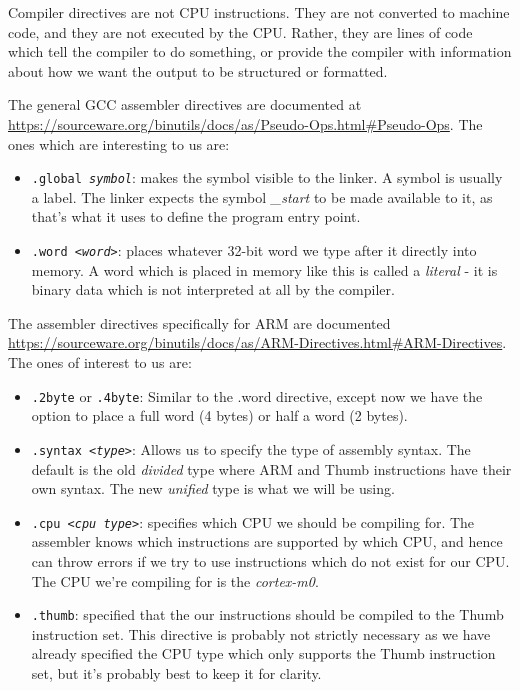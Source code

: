 Compiler directives are not CPU instructions. They are not converted to machine code, and they are not executed by the CPU. Rather, they are lines of code which tell the compiler to do something, or provide the compiler with information about how we want the output to be structured or formatted. 

The general GCC assembler directives are documented at \url{https://sourceware.org/binutils/docs/as/Pseudo-Ops.html#Pseudo-Ops}. The ones which are interesting to us are:
\begin{itemize}
  \item \texttt{.global \textit{symbol}}: makes the symbol visible to the linker. A symbol is usually a label. The linker expects the symbol \textit{\_start} to be made available to it, as that's what it uses to define the program entry point.
  \item \texttt{.word \textit{<word>}}: places whatever 32-bit word we type after it directly into memory. A word which is placed in memory like this is called a \emph{literal} - it is binary data which is not interpreted at all by the compiler.
\end{itemize}

The assembler directives specifically for ARM are documented \url{https://sourceware.org/binutils/docs/as/ARM-Directives.html#ARM-Directives}. The ones of interest to us are:
\begin{itemize}
  \item \texttt{.2byte} or \texttt{.4byte}: Similar to the .word directive, except now we have the option to place a full word (4 bytes) or half a word (2 bytes).
  \item \texttt{.syntax \textit{<type>}}: Allows us to specify the type of assembly syntax. The default is the old \emph{divided} type where ARM and Thumb instructions have their own syntax. The new \emph{unified} type is what we will be using.
  \item \texttt{.cpu \textit{<cpu type>}}: specifies which CPU we should be compiling for. The assembler knows which instructions are supported by which CPU, and hence can throw errors if we try to use instructions which do not exist for our CPU. The CPU we're compiling for is the \emph{cortex-m0}.
  \item \texttt{.thumb}: specified that the our instructions should be compiled to the Thumb instruction set. This directive is probably not strictly necessary as we have already specified the CPU type which only supports the Thumb instruction set, but it's probably best to keep it for clarity. 
\end{itemize}

